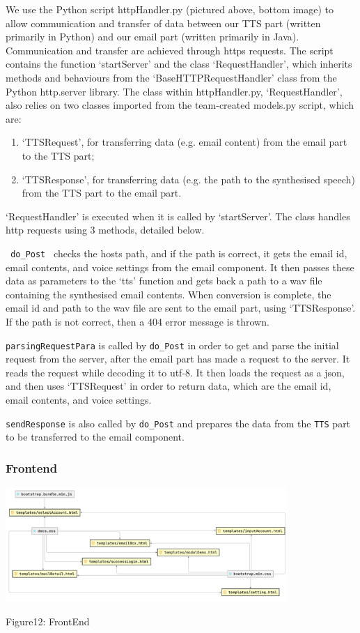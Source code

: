 \documentclass{article}
\begin{document}
We use the Python script httpHandler.py (pictured above, bottom image) to allow communication and transfer of data between our TTS part (written primarily in Python) and our email part (written primarily in Java). Communication and transfer are achieved through https requests. The script contains the function ‘startServer’ and the class ‘RequestHandler’, which inherits methods and behaviours from the ‘BaseHTTPRequestHandler’ class from the Python http.server library. The class within httpHandler.py, ‘RequestHandler’, also relies on two classes imported from the team-created models.py script, which are: 
\begin{enumerate}
\item ‘TTSRequest’, for transferring data (e.g. email content) from the email part to the TTS part; 
\item ‘TTSResponse’, for transferring data (e.g. the path to the synthesised speech) from the TTS part to the email part.
\end{enumerate}

‘RequestHandler’ is executed when it is called by ‘startServer’. The class handles http requests using 3 methods, detailed below.

\texttt{ do\_Post } checks the hosts path, and if the path is correct, it gets the email id, email contents, and voice settings from the email component. It then passes these data as parameters to the ‘tts’ function and gets back a path to a wav file containing the synthesised email contents. When conversion is complete, the email id and path to the wav file are sent to the email part, using ‘TTSResponse’. If the path is not correct, then a 404 error message is thrown.

\texttt{parsingRequestPara} is called by \texttt{do\_Post} in order to get and parse the initial request from the server, after the email part has made a request to the server. It reads the request while decoding it to utf-8. It then loads the request as a json, and then uses ‘TTSRequest’ in order to return data, which are the email id, email contents, and voice settings.

\texttt{sendResponse} is also called by \texttt{do\_Post} and prepares the data from the \texttt{TTS} part to be transferred to the email component. 

\subsubsection{Frontend}
\includegraphics[width=0.8\textwidth]{FrontEnd.png}
\begin{center}
Figure12: FrontEnd
\end{center}
\end{document}
